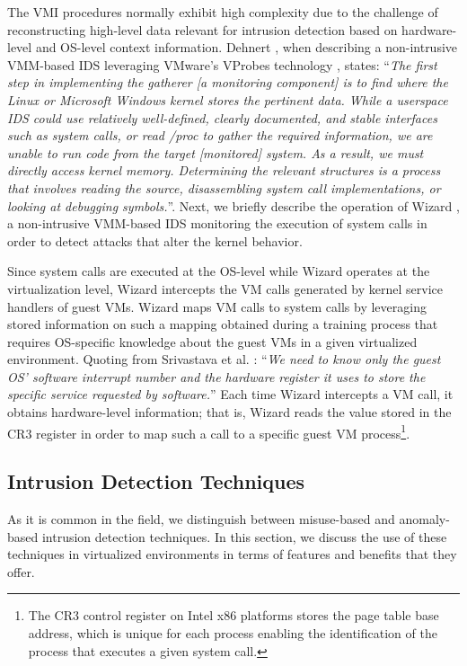 The VMI procedures normally exhibit high complexity due to the challenge of reconstructing high-level data relevant for intrusion detection based on hardware-level and OS-level context information. Dehnert \cite{dehnert:intrusion}, when describing a non-intrusive VMM-based IDS leveraging VMware's VProbes technology \cite{vprobes}, states: ``\textit{The first step in implementing the gatherer [a monitoring component] is to find where the Linux or Microsoft Windows kernel stores the pertinent data. While a userspace IDS could use relatively well-defined, clearly documented, and stable interfaces such as system calls, or read /proc to gather the required information, we are unable to run code from the target [monitored] system. As a result, we must directly access kernel memory. Determining the relevant structures is a process that involves reading the source, disassembling system call implementations, or looking at debugging symbols.}''. Next, we briefly describe the operation of Wizard \cite{srivastava:secure}, a non-intrusive VMM-based IDS monitoring the execution of system calls in order to detect attacks that alter the kernel behavior. 

Since system calls are executed at the OS-level while Wizard operates at the virtualization level, Wizard intercepts the VM calls generated by kernel service handlers of guest VMs. Wizard maps VM calls to system calls by leveraging stored information on such a mapping obtained during a training process that requires OS-specific knowledge about the guest VMs in a given virtualized environment. Quoting from Srivastava et al. \cite{srivastava:secure}: ``\textit{We need to know only the guest OS' software interrupt number and the hardware register it uses to store the specific service requested by software.}'' Each time Wizard intercepts a VM call, it obtains hardware-level information; that is, Wizard reads the value stored in the CR3 register in order to map such a call to a specific guest VM process\footnote{The CR3 control register on Intel x86 platforms stores the page table base address, which is unique for each process enabling the identification of the process that executes a given system call.}.

\subsection{Intrusion Detection Techniques}
\label{sec:intrusion_detection_techniques}

As it is common in the field, we distinguish between misuse-based and anomaly-based intrusion detection techniques. In this section, we discuss the use of these techniques in virtualized environments in terms of features and benefits that they offer. 

